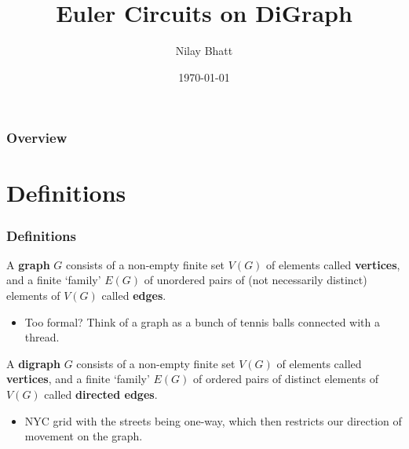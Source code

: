 \documentclass{beamer}
\title[Euler Circuits]{Euler Circuits on DiGraph } %
\author{Nilay Bhatt} %
\institute[CCSU] %
{
Central Connecticut State University \\ Dr. Rachel Schwell\\ %
\medskip
\textit{nilaybhatt@my.ccsu.edu} %
}
\date{\today} %
\begin{document}
\begin{frame}	
\titlepage %
\end{frame}

\begin{frame}
\frametitle{Overview} %
\tableofcontents %
\end{frame}


\section{Definitions} 
\begin{frame}
\frametitle{Definitions}
\begin{definition}[Graph]
A \textbf{graph} $G$ consists of a non-empty finite set $V(G)$ of elements called \textbf{vertices},
and a finite `family'  $ E(G)$ of unordered pairs of (not necessarily distinct) elements
of $V(G)$ called \textbf{edges}.
\end{definition}
\begin{itemize}
\item Too formal? Think of a graph as a bunch of tennis balls connected with a thread.
\end{itemize}
\begin{definition}[Digraph]
A \textbf{digraph} $G$ consists of a non-empty finite set $V(G)$ of elements called \textbf{vertices},
and a finite `family'  $E(G)$ of ordered pairs of distinct elements of $V(G)$ called \textbf{directed edges}.
\end{definition}
\begin{itemize}
\item NYC grid with the streets being one-way, which then restricts our direction of movement on the graph.
\end{itemize}
\end{frame}
\end{document}
